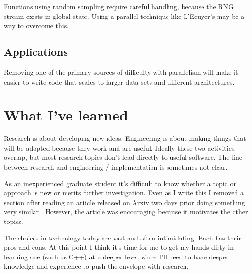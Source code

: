 \documentclass[12pt]{article}
\begin{document}
Functions using random sampling require careful handling, because the RNG
stream exists in global state. Using a parallel technique like L'Ecuyer's
may be a way to overcome this.

\subsection{Applications}

Removing one of the primary sources of difficulty with parallelism will
make it easier to write code that scales to larger data sets and different
architectures.

\section{What I've learned}

Research is about developing new ideas. Engineering is about making
things that will be adopted because they work and are useful. Ideally these
two activities overlap, but most research topics don't lead directly to useful
software. The line between research and engineering / implementation is
sometimes not clear.

As an inexperienced graduate student it's difficult to know whether a topic
or approach is new or merits further investigation. Even as I write this I
removed a section after reading an article released on Arxiv two days prior
doing something very similar \cite{compare_bigdata}. However, the article
was encouraging because it motivates the other topics.

The choices in technology today are vast and often intimidating. Each has
their pros and cons. At this point I think it's time for me to get my hands
dirty in learning one (such as C++) at a deeper level, since I'll need to
have deeper knowledge and experience to push the envelope with research.


 
\end{document}

